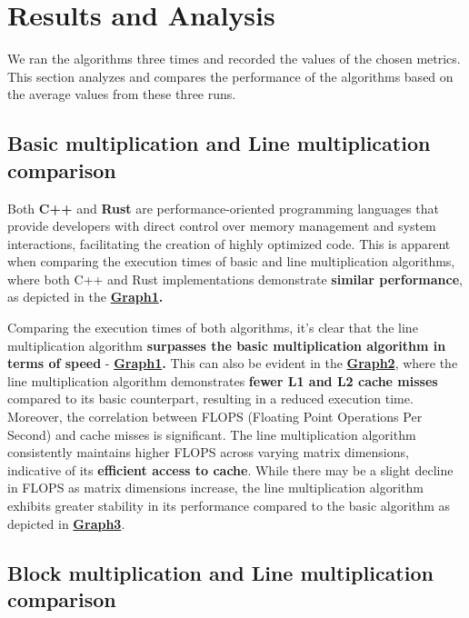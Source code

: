 \section{Results and Analysis}
We ran the algorithms three times 
and recorded the values of the chosen 
metrics. This section analyzes and 
compares the performance of the
algorithms based on the average 
values from these three runs.

\subsection{Basic multiplication and Line multiplication comparison}
Both \textbf{C++} and \textbf{Rust} are performance-oriented programming languages 
that provide developers with direct control over memory 
management and system interactions, facilitating the 
creation of highly optimized code. This is apparent 
when comparing the execution times of basic and line 
multiplication algorithms, where both C++ and Rust 
implementations demonstrate \textbf{similar performance}, as 
depicted in the \textbf{\hyperref[graph:BLG1]{Graph1}.}

Comparing the execution times of both algorithms, 
it's clear that the line multiplication algorithm 
\textbf{surpasses the basic multiplication algorithm in 
terms of speed} - \textbf{\hyperref[graph:BLG1]{Graph1}.} This can also be
evident in the \textbf{\hyperref[graph:BLG2]{Graph2}}, 
where the line multiplication algorithm demonstrates 
\textbf{fewer L1 and L2 cache misses} compared to its basic 
counterpart, resulting in a reduced execution time. 
Moreover, the correlation between FLOPS 
(Floating Point Operations Per Second) and cache misses 
is significant. The line multiplication algorithm 
consistently maintains higher FLOPS across varying 
matrix dimensions, indicative of its \textbf{efficient 
access to cache}. While there may be a 
slight decline in FLOPS as matrix dimensions increase, the 
line multiplication algorithm exhibits 
greater stability in its performance compared to the 
basic algorithm as depicted in \textbf{\hyperref[graph:BLG3]{Graph3}}.

\subsection{Block multiplication and Line multiplication comparison}



